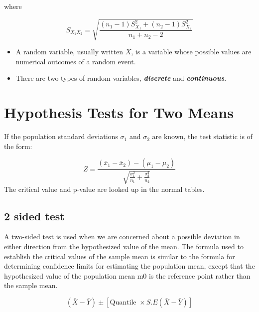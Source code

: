 \documentclass[]{report}
\begin{document}
where

\[
S_{X_1X_2} = \sqrt{\frac{(n_1-1)S_{X_1}^2+(n_2-1)S_{X_2}^2}{n_1+n_2-2}}
\] 

\begin{itemize}
\item A random variable, usually written $X$, is a variable whose possible values are numerical outcomes of a random event.
\vspace{0.4cm}
\item There are two types of random variables, \textit{\textbf{discrete}} and \textit{\textbf{continuous}}.
\end{itemize}







\section{Hypothesis Tests for Two Means}

If the population standard deviations $\sigma_1$ and $\sigma_2$
are known, the test statistic is of the form:

\begin{equation}
Z = \frac{(\bar{x}_1 - \bar{x}_2) - (\mu_1 - \mu_2 ) }{\sqrt{
\frac{\sigma^2_1}{n_1}+\frac{\sigma^2_2}{n_2}} }
\end{equation}
The critical value and p-value are looked up in the normal tables.









\subsection{2 sided test}
A two-sided test is used when we are concerned about a possible
deviation in either direction from the hypothesized value of the
mean. The formula used to establish the critical values of the
sample mean is similar to the formula for determining confidence
limits for estimating the population mean, except that the
hypothesized value of the population mean m0 is the reference
point rather than the sample mean.







\[ ( \bar{X} - \bar{Y} ) \pm \left[ \mbox{Quantile } \times S.E(\bar{X}-\bar{Y}) \right] \]
\end{document}
